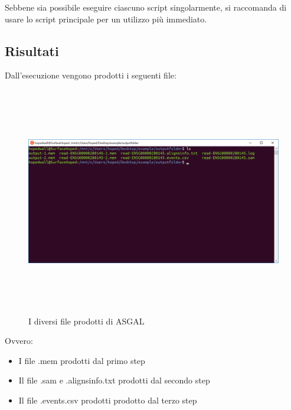 Sebbene sia possibile eseguire ciascuno script singolarmente, si raccomanda di usare lo script principale per un utilizzo più immediato. 

\newpage

\subsection{Risultati}

Dall'esecuzione vengono prodotti i seguenti file:

\begin{figure}[h!]
	\centering
	\includegraphics[width=\linewidth,height=10cm]{images/fileprodotti.png}
	\caption{I diversi file prodotti di ASGAL}
  \label{fig:ProducedFiles}
\end{figure}

Ovvero:

\begin{itemize}
	\item I file .mem prodotti dal primo step
	\item Il file .sam e .alignsinfo.txt prodotti dal secondo step
	\item	Il file .events.csv prodotti prodotto dal terzo step
\end{itemize}

%
%

